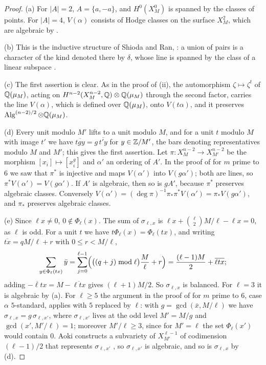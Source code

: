 \begin{proof}
(a) For $|A|=2$, $A=\{a,-a\}$, and $H^{0}(X^{0}_{M})$ is spanned by the
classes of points. For $|A|=4$, $V(\alpha)$ consists of Hodge classes on the
surface $X^{2}_{M}$, which are algebraic by .

(b) This is the inductive structure of Shioda and Ran,
\cite[Theorem~1-4]{Aok87}: a union of pairs is a character of the kind
denoted there by $\delta$, whose line is spanned by the class of a linear
subspace \cite[Theorem~1-1]{Aok87}.

(c) The first assertion is clear. As in the proof of
(ii), the automorphism $\zeta\mapsto\zeta^{t}$ of
$\mathbb{Q}(\mu_{M})$, acting on $H^{n-2}(X^{n-2}_{M},\mathbb{Q})\otimes\mathbb{Q}(\mu_{M})$
through the second factor, carries the line $V(\alpha)$, which is defined
over $\mathbb{Q}(\mu_{M})$, onto $V(t\alpha)$, and it preserves
$\operatorname{Alg}^{(n-2)/2}\otimes\mathbb{Q}(\mu_{M})$.

(d) Every unit modulo $M'$ lifts to a unit modulo $M$, and for a unit $t$
modulo $M$ with image $t'$ we have $\overline{tgy}=g\,\overline{t'y}$ for
$y\in\mathbb{Z}/M'$, the bars denoting representatives modulo $M$ and $M'$; this
gives the first assertion. Let $\pi\colon X^{n-2}_{M}\to X^{n-2}_{M'}$ be the
morphism $[x_{i}]\mapsto[x_{i}^{g}]$ and $\alpha'$ an ordering of $A'$. In
the proof of  for $m$ prime to $6$ we saw that $\pi^{*}$ is
injective and maps $V(\alpha')$ into $V(g\alpha')$; both are lines, so
$\pi^{*}V(\alpha')=V(g\alpha')$. If $A'$ is algebraic, then so is $gA'$,
because $\pi^{*}$ preserves algebraic classes. Conversely
$V(\alpha')=(\deg\pi)^{-1}\pi_{*}\pi^{*}V(\alpha')=\pi_{*}V(g\alpha')$, and
$\pi_{*}$ preserves algebraic classes.

(e) Since $\ell x\ne0$, $0\notin\Phi_{\ell}(x)$. The sum of
$\sigma_{\ell,x}$ is $\ell x+\binom{\ell}{2}M/\ell-\ell x=0$, as $\ell$ is
odd. For a unit $t$ we have $t\Phi_{\ell}(x)=\Phi_{\ell}(tx)$, and writing
$\overline{tx}=qM/\ell+r$ with $0\le r<M/\ell$,
\[
  \sum_{y\in\Phi_{\ell}(tx)}\bar y=\sum_{j=0}^{\ell-1}\Bigl(\bigl((q+j)\bmod
  \ell\bigr)\frac{M}{\ell}+r\Bigr)=\frac{(\ell-1)M}{2}+\overline{\ell tx};
\]
adding $\overline{-\ell tx}=M-\overline{\ell tx}$ gives $(\ell+1)M/2$. So
$\sigma_{\ell,x}$ is balanced. For $\ell=3$ it is algebraic by (a). For
$\ell\ge5$ the argument in the proof of  for $m$ prime to $6$,
case $\alpha$ $5$-standard, applies with $5$ replaced by $\ell$: with
$g=\gcd(\bar x,M/\ell)$ we have $\sigma_{\ell,x}=g\,\sigma_{\ell,x'}$, where
$\sigma_{\ell,x'}$ lives at the odd level $M'=M/g$ and $\gcd(x',M'/\ell)=1$;
moreover $M'/\ell\ge3$, since for $M'=\ell$ the set $\Phi_{\ell}(x')$ would
contain $0$. Aoki constructs a subvariety of $X^{\ell-1}_{M'}$ of
codimension $(\ell-1)/2$ that represents $\sigma_{\ell,x'}$
\cite[Theorem~2-1]{Aok87}, so $\sigma_{\ell,x'}$ is algebraic, and so is
$\sigma_{\ell,x}$ by (d).
\end{proof}

